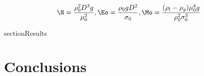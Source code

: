 \documentclass[12pt,fleqn]{article}
\begin{document}
\begin{equation}
 \N = \frac{\rho_0^2 D^3 g}{\mu_0^2},
 \Eo = \frac{\rho_0 g D^2}{\sigma_0},
 \Mo = \frac{(\rho_l-\rho_g)\mu_0^4 g}{\rho_{0}^2 \sigma_0^3} 
 \label{eq:nd-groups}
\end{equation}

section{Results}
\section{Conclusions}



\end{document}
